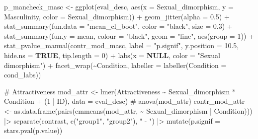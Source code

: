 \documentclass[
  bookmarksnumbered]{article}
\newenvironment{Shaded}{\begin{snugshade}}{\end{snugshade}}
\newcommand{\AttributeTok}[1]{\textcolor[rgb]{0.80,0.80,0.80}{#1}}
\newcommand{\CommentTok}[1]{\textcolor[rgb]{0.50,0.62,0.50}{#1}}
\newcommand{\ConstantTok}[1]{\textcolor[rgb]{0.86,0.64,0.64}{\textbf{#1}}}
\newcommand{\DecValTok}[1]{\textcolor[rgb]{0.86,0.86,0.80}{#1}}
\newcommand{\FloatTok}[1]{\textcolor[rgb]{0.75,0.75,0.82}{#1}}
\newcommand{\FunctionTok}[1]{\textcolor[rgb]{0.94,0.94,0.56}{#1}}
\newcommand{\NormalTok}[1]{\textcolor[rgb]{0.80,0.80,0.80}{#1}}
\newcommand{\OtherTok}[1]{\textcolor[rgb]{0.94,0.94,0.56}{#1}}
\newcommand{\SpecialCharTok}[1]{\textcolor[rgb]{0.86,0.64,0.64}{#1}}
\newcommand{\StringTok}[1]{\textcolor[rgb]{0.80,0.58,0.58}{#1}}
\begin{document}
\begin{Shaded}
\begin{Highlighting}[]
\NormalTok{p\_mancheck\_masc }\OtherTok{\textless{}{-}} \FunctionTok{ggplot}\NormalTok{(eval\_desc, }\FunctionTok{aes}\NormalTok{(}\AttributeTok{x =}\NormalTok{ Sexual\_dimorphism, }
                                         \AttributeTok{y =}\NormalTok{ Masculinity, }
                                         \AttributeTok{color =}\NormalTok{ Sexual\_dimorphism)) }\SpecialCharTok{+}
  \FunctionTok{geom\_jitter}\NormalTok{(}\AttributeTok{alpha =} \FloatTok{0.5}\NormalTok{) }\SpecialCharTok{+}
  \FunctionTok{stat\_summary}\NormalTok{(}\AttributeTok{fun.data =} \StringTok{"mean\_cl\_boot"}\NormalTok{,}
               \AttributeTok{color =} \StringTok{"black"}\NormalTok{, }
               \AttributeTok{size =} \FloatTok{0.3}\NormalTok{) }\SpecialCharTok{+}
  \FunctionTok{stat\_summary}\NormalTok{(}\AttributeTok{fun.y =}\NormalTok{ mean, }
               \AttributeTok{colour =} \StringTok{"black"}\NormalTok{, }
               \AttributeTok{geom =} \StringTok{"line"}\NormalTok{, }
               \FunctionTok{aes}\NormalTok{(}\AttributeTok{group =} \DecValTok{1}\NormalTok{)) }\SpecialCharTok{+}
  \FunctionTok{stat\_pvalue\_manual}\NormalTok{(contr\_mod\_masc, }\AttributeTok{label =} \StringTok{"p.signif"}\NormalTok{,}
                     \AttributeTok{y.position =} \FloatTok{10.5}\NormalTok{,}
                     \AttributeTok{hide.ns =} \ConstantTok{TRUE}\NormalTok{,}
                     \AttributeTok{tip.length =} \DecValTok{0}\NormalTok{) }\SpecialCharTok{+}
  \FunctionTok{labs}\NormalTok{(}\AttributeTok{x =} \ConstantTok{NULL}\NormalTok{,}
       \AttributeTok{color =} \StringTok{"Sexual dimorphism"}\NormalTok{) }\SpecialCharTok{+}
  \FunctionTok{facet\_wrap}\NormalTok{(}\SpecialCharTok{\textasciitilde{}}\NormalTok{Condition,}
             \AttributeTok{labeller =} \FunctionTok{labeller}\NormalTok{(}\AttributeTok{Condition =}\NormalTok{ cond\_labs))}

\CommentTok{\# Attractiveness}
\NormalTok{mod\_attr }\OtherTok{\textless{}{-}} \FunctionTok{lmer}\NormalTok{(Attractiveness }\SpecialCharTok{\textasciitilde{}}\NormalTok{ Sexual\_dimorphism }\SpecialCharTok{*}\NormalTok{ Condition }\SpecialCharTok{+}\NormalTok{ (}\DecValTok{1} \SpecialCharTok{|}\NormalTok{ ID), }\AttributeTok{data =}\NormalTok{ eval\_desc)}
\CommentTok{\# anova(mod\_attr)}
\NormalTok{contr\_mod\_attr }\OtherTok{\textless{}{-}} \FunctionTok{as.data.frame}\NormalTok{(}\FunctionTok{pairs}\NormalTok{(}\FunctionTok{emmeans}\NormalTok{(mod\_attr,}
                                              \SpecialCharTok{\textasciitilde{}}\NormalTok{ Sexual\_dimorphism }\SpecialCharTok{|}\NormalTok{ Condition))) }\SpecialCharTok{|\textgreater{}} 
  \FunctionTok{separate}\NormalTok{(contrast, }\FunctionTok{c}\NormalTok{(}\StringTok{"group1"}\NormalTok{, }\StringTok{"group2"}\NormalTok{), }\StringTok{" {-} "}\NormalTok{) }\SpecialCharTok{|\textgreater{}} 
  \FunctionTok{mutate}\NormalTok{(}\AttributeTok{p.signif =} \FunctionTok{stars.pval}\NormalTok{(p.value))}


\end{Highlighting}
\end{Shaded}
\end{document}
